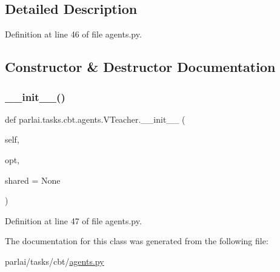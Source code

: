 \subsection{Detailed Description}


Definition at line 46 of file agents.\+py.



\subsection{Constructor \& Destructor Documentation}
\mbox{\label{classparlai_1_1tasks_1_1cbt_1_1agents_1_1VTeacher_a19797ded538cc0a6d4cd544c4e2b6b1b}} 
\subsubsection{\texorpdfstring{\+\_\+\+\_\+init\+\_\+\+\_\+()}{\_\_init\_\_()}}
{\footnotesize\ttfamily def parlai.\+tasks.\+cbt.\+agents.\+V\+Teacher.\+\_\+\+\_\+init\+\_\+\+\_\+ (\begin{DoxyParamCaption}\item[{}]{self,  }\item[{}]{opt,  }\item[{}]{shared = {\ttfamily None} }\end{DoxyParamCaption})}



Definition at line 47 of file agents.\+py.



The documentation for this class was generated from the following file\+:\begin{DoxyCompactItemize}
\item 
parlai/tasks/cbt/\hyperlink{parlai_2tasks_2cbt_2agents_8py}{agents.\+py}\end{DoxyCompactItemize}
